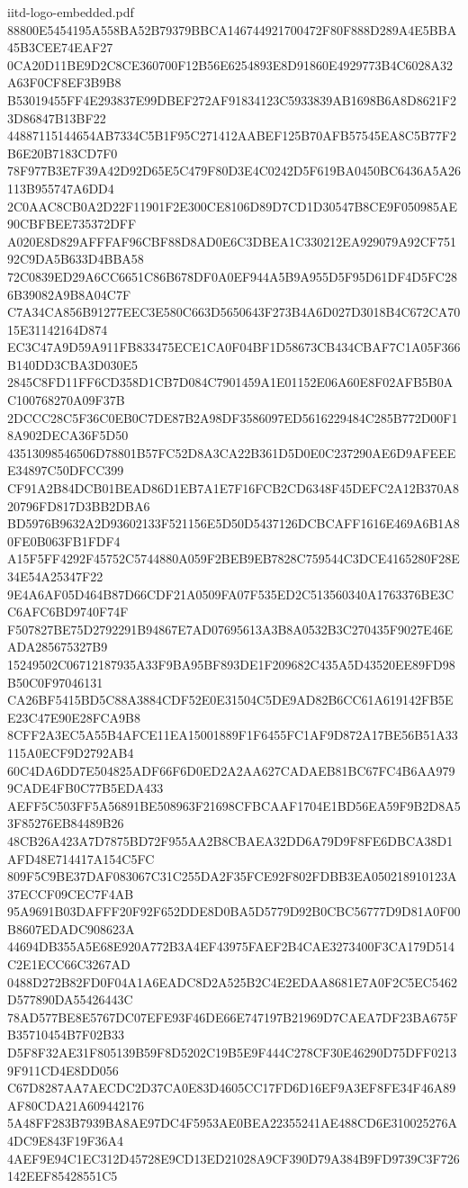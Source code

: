 \begin{filecontents*}[overwrite]{iitd-logo-embedded.pdf}
88800E5454195A558BA52B79379BBCA146744921700472F80F888D289A4E5BBA45B3CEE74EAF27
0CA20D11BE9D2C8CE360700F12B56E6254893E8D91860E4929773B4C6028A32A63F0CF8EF3B9B8
B53019455FF4E293837E99DBEF272AF91834123C5933839AB1698B6A8D8621F23D86847B13BF22
44887115144654AB7334C5B1F95C271412AABEF125B70AFB57545EA8C5B77F2B6E20B7183CD7F0
78F977B3E7F39A42D92D65E5C479F80D3E4C0242D5F619BA0450BC6436A5A26113B955747A6DD4
2C0AAC8CB0A2D22F11901F2E300CE8106D89D7CD1D30547B8CE9F050985AE90CBFBEE735372DFF
A020E8D829AFFFAF96CBF88D8AD0E6C3DBEA1C330212EA929079A92CF75192C9DA5B633D4BBA58
72C0839ED29A6CC6651C86B678DF0A0EF944A5B9A955D5F95D61DF4D5FC286B39082A9B8A04C7F
C7A34CA856B91277EEC3E580C663D5650643F273B4A6D027D3018B4C672CA7015E31142164D874
EC3C47A9D59A911FB833475ECE1CA0F04BF1D58673CB434CBAF7C1A05F366B140DD3CBA3D030E5
2845C8FD11FF6CD358D1CB7D084C7901459A1E01152E06A60E8F02AFB5B0AC100768270A09F37B
2DCCC28C5F36C0EB0C7DE87B2A98DF3586097ED5616229484C285B772D00F18A902DECA36F5D50
43513098546506D78801B57FC52D8A3CA22B361D5D0E0C237290AE6D9AFEEEE34897C50DFCC399
CF91A2B84DCB01BEAD86D1EB7A1E7F16FCB2CD6348F45DEFC2A12B370A820796FD817D3BB2DBA6
BD5976B9632A2D93602133F521156E5D50D5437126DCBCAFF1616E469A6B1A80FE0B063FB1FDF4
A15F5FF4292F45752C5744880A059F2BEB9EB7828C759544C3DCE4165280F28E34E54A25347F22
9E4A6AF05D464B87D66CDF21A0509FA07F535ED2C513560340A1763376BE3CC6AFC6BD9740F74F
F507827BE75D2792291B94867E7AD07695613A3B8A0532B3C270435F9027E46EADA285675327B9
15249502C06712187935A33F9BA95BF893DE1F209682C435A5D43520EE89FD98B50C0F97046131
CA26BF5415BD5C88A3884CDF52E0E31504C5DE9AD82B6CC61A619142FB5EE23C47E90E28FCA9B8
8CFF2A3EC5A55B4AFCE11EA15001889F1F6455FC1AF9D872A17BE56B51A33115A0ECF9D2792AB4
60C4DA6DD7E504825ADF66F6D0ED2A2AA627CADAEB81BC67FC4B6AA9799CADE4FB0C77B5EDA433
AEFF5C503FF5A56891BE508963F21698CFBCAAF1704E1BD56EA59F9B2D8A53F85276EB84489B26
48CB26A423A7D7875BD72F955AA2B8CBAEA32DD6A79D9F8FE6DBCA38D1AFD48E714417A154C5FC
809F5C9BE37DAF083067C31C255DA2F35FCE92F802FDBB3EA050218910123A37ECCF09CEC7F4AB
95A9691B03DAFFF20F92F652DDE8D0BA5D5779D92B0CBC56777D9D81A0F00B8607EDADC908623A
44694DB355A5E68E920A772B3A4EF43975FAEF2B4CAE3273400F3CA179D514C2E1ECC66C3267AD
0488D272B82FD0F04A1A6EADC8D2A525B2C4E2EDAA8681E7A0F2C5EC5462D577890DA55426443C
78AD577BE8E5767DC07EFE93F46DE66E747197B21969D7CAEA7DF23BA675FB35710454B7F02B33
D5F8F32AE31F805139B59F8D5202C19B5E9F444C278CF30E46290D75DFF02139F911CD4E8DD056
C67D8287AA7AECDC2D37CA0E83D4605CC17FD6D16EF9A3EF8FE34F46A89AF80CDA21A609442176
5A48FF283B7939BA8AE97DC4F5953AE0BEA22355241AE488CD6E310025276A4DC9E843F19F36A4
4AEF9E94C1EC312D45728E9CD13ED21028A9CF390D79A384B9FD9739C3F726142EEF85428551C5

\end{filecontents*}
